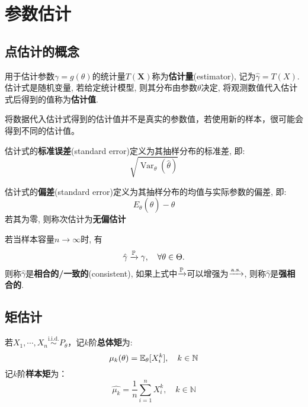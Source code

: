 \chapter{参数估计}

\section{点估计的概念}

\begin{definition}[点估计]
    用于估计参数$\gamma = g(\theta)$的统计量$T(\mathbf{X})$称为\textbf{估计量}(estimator), 记为$\hat{\gamma} = T(X)$. 估计式是随机变量, 若给定统计模型, 则其分布由参数$\theta$决定, 将观测数值代入估计式后得到的值称为\textbf{估计值}.
\end{definition}

将数据代入估计式得到的估计值并不是真实的参数值，若使用新的样本，很可能会得到不同的估计值。

\begin{definition}[标准误差]
    估计式的\textbf{标准误差}(standard error)定义为其抽样分布的标准差, 即:
    \[ \sqrt{\operatorname{Var}_{\theta}(\hat{\theta})} \]
\end{definition}

\begin{definition}[无偏估计]
    估计式的\textbf{偏差}(standard error)定义为其抽样分布的均值与实际参数的偏差, 即:
    \[ E_{\theta}(\hat{\theta})-\theta \]
    若其为零, 则称次估计为\textbf{无偏估计}
\end{definition}

\begin{definition}[相合]
    若当样本容量$n\to\infty$时, 有
    \[ \hat{\gamma} \xrightarrow{\P} \gamma, \quad \forall \theta\in\Theta. \]
    则称$\hat{\gamma}$是\textbf{相合的/一致的}(consistent), 如果上式中$\xrightarrow{\P}$可以增强为$\xrightarrow{\as}$, 则称$\hat{\gamma}$是\textbf{强相合的}.
\end{definition}

\section{矩估计}

\begin{definition}[总体矩与样本矩]
    若$X_1,\cdots ,X_n \overset{\text{i.i.d.}}{\sim} P_{\theta}$，记$k$阶\textbf{总体矩}为:
    \[ \mu_k(\theta) = \E_{\theta}[X_i^k] ,\quad k \in \mathbb{N}\]
    记$k$阶\textbf{样本矩}为：
    \[ \hat{\mu_k}=\frac{1}{n}\sum_{i=1}^n X_i^k ,\quad k \in \mathbb{N}\]
\end{definition}

